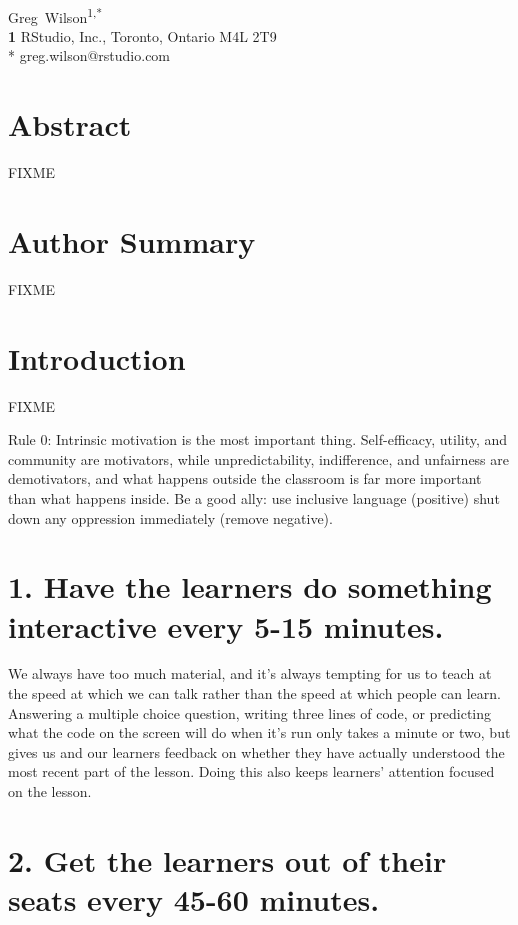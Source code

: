 \documentclass[10pt,letterpaper]{article}
\newcommand{\rulemajor}[1]{\section{#1}}
\begin{document}
\vspace*{0.2in}

\begin{flushleft}
{\Large
\textbf{}
}
\newline
\\
{Greg~Wilson}\textsuperscript{1,*}
\\
\textbf{1} RStudio, Inc., Toronto, Ontario M4L 2T9
\\
\bigskip
* greg.wilson@rstudio.com
\end{flushleft}

\section*{Abstract}

FIXME

\section*{Author Summary}

FIXME

\section*{Introduction}

FIXME

Rule 0: Intrinsic motivation is the most important thing.
Self-efficacy, utility, and community are motivators,
while unpredictability, indifference, and unfairness are demotivators,
and what happens outside the classroom is far more important than what happens inside.
Be a good ally:
use inclusive language (positive)
shut down any oppression immediately (remove negative).

\rulemajor{1. Have the learners do something interactive every 5-15 minutes.}

We always have too much material,
and it's always tempting for us to teach at the speed at which we can talk
rather than the speed at which people can learn.
Answering a multiple choice question,
writing three lines of code,
or predicting what the code on the screen will do when it's run only takes a minute or two,
but gives us and our learners feedback on whether they have actually understood the most recent part of the lesson.
Doing this also keeps learners' attention focused on the lesson.

\rulemajor{2. Get the learners out of their seats every 45-60 minutes.}
\end{document}
